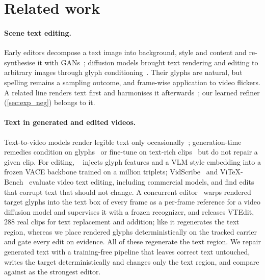 \section{Related work}
\label{sec:related}

\paragraph{Scene text editing.} Early editors decompose a text image into background, style and content and re-synthesise it with GANs~\cite{wu2019srnet,roy2020stefann,krishnan2023textstylebrush,qu2023mostel}; diffusion models brought text rendering and editing to arbitrary images through glyph conditioning~\cite{chen2023textdiffuser,yang2023glyphcontrol,tuo2024anytext,tuo2024anytext2,ji2023diffste,zhao2024udifftext,liu2024glyphbyt5,zeng2024textctrl,glyphmastero2025}. Their glyphs are natural, but spelling remains a sampling outcome, and frame-wise application to video flickers. A related line renders text first and harmonises it afterwards~\cite{zhan2019sfgan,glyphbanana2026}; our learned refiner (\cref{sec:exp_neg}) belongs to it.

\paragraph{Text in generated and edited videos.} Text-to-video models render legible text only occasionally~\cite{t2vtextbench2025,vtrbench2026,textvbench2026,avgenbench2026,tokbench2025}; generation-time remedies condition on glyphs~\cite{liu2024textanimator} or fine-tune on text-rich clips~\cite{vtp2025} but do not repair a given clip. For editing, \steer~\cite{zeng2026steervte} injects glyph features and a VLM style embedding into a frozen VACE backbone trained on a million triplets; VidScribe~\cite{vidscribe2026} and ViTeX-Bench~\cite{vitexbench2026} evaluate video text editing, including commercial models, and find edits that corrupt text that should not change. A concurrent editor~\cite{zhang2026trajglyph} warps rendered target glyphs into the text box of every frame as a per-frame reference for a video diffusion model and supervises it with a frozen recognizer, and releases VTEdit, 288 real clips for text replacement and addition; like \steer it regenerates the text region, whereas we place rendered glyphs deterministically on the tracked carrier and gate every edit on evidence. All of these regenerate the text region. We repair generated text with a training-free pipeline that leaves correct text untouched, writes the target deterministically and changes only the text region, and compare against \steer as the strongest editor.

